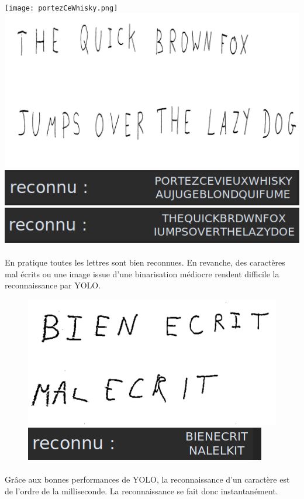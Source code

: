 \documentclass[a4paper]{article}
\begin{document}
			\begin{center}
				\texttt{[image: portezCeWhisky.png]}
				\includegraphics[width=.45\textwidth]{theBrownFox.png}
				\includegraphics[width=.45\textwidth]{portezCeWhiskyLabel.png}
				\includegraphics[width=.45\textwidth]{theBrownFoxLabel.png}
				\caption{ Pangrammes français et anglais}
			\end{center}
			\newline
			\newline
			\paragraph{} En pratique toutes les lettres sont bien reconnues. En revanche, des caractères mal écrits ou une image issue d'une binarisation médiocre rendent difficile la reconnaissance par YOLO.
			


			\begin{figure}[h]
				\includegraphics[width=.4\textwidth]{bienEcritMalEcrit.png}
				\includegraphics[width=.4\textwidth]{bienEcritMalEcritLabel.png}
			\end{figure}


			\paragraph{} Grâce aux bonnes performances de YOLO, la reconnaissance d'un caractère est de l'ordre de la milliseconde. La reconnaissance se fait donc instantanément.
\end{document}
